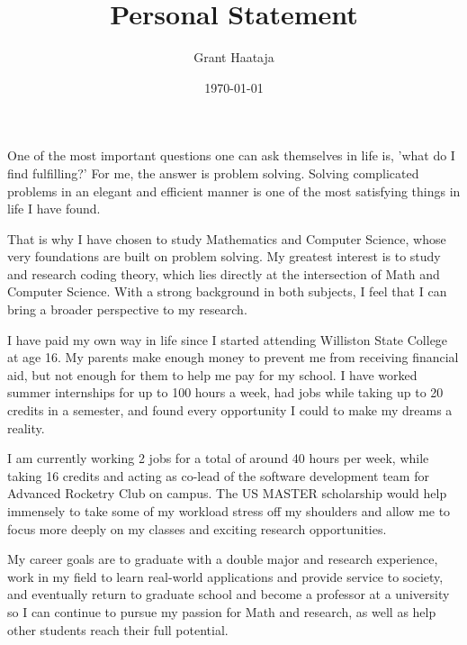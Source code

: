 \documentclass[11pt,final,twoside]{article} %
\title{Personal Statement}
\author{Grant Haataja}
\date{\today}
\begin{document}
	\maketitle

One of the most important questions one can ask themselves in life is, 'what do I find fulfilling?' For me, the answer is problem solving. Solving complicated problems in an elegant and efficient manner is one of the most satisfying things in life I have found. 
 
That is why I have chosen to study Mathematics and Computer Science, whose very foundations are built on problem solving. My greatest interest is to study and research coding theory, which lies directly at the intersection of Math and Computer Science. With a strong background in both subjects, I feel that I can bring a broader perspective to my research.

I have paid my own way in life since I started attending Williston State College at age 16. My parents make enough money to prevent me from receiving financial aid, but not enough for them to help me pay for my school. I have worked summer internships for up to 100 hours a week, had jobs while taking up to 20 credits in a semester, and found every opportunity I could to make my dreams a reality. 

I am currently working 2 jobs for a total of around 40 hours per week, while taking 16 credits and acting as co-lead of the software development team for Advanced Rocketry Club on campus. The US MASTER scholarship would help immensely to take some of my workload stress off my shoulders and allow me to focus more deeply on my classes and exciting research opportunities. 

My career goals are to graduate with a double major and research experience, work in my field to learn real-world applications and provide service to society, and eventually return to graduate school and become a professor at a university so I can continue to pursue my passion for Math and research, as well as help other students reach their full potential.
\end{document}

